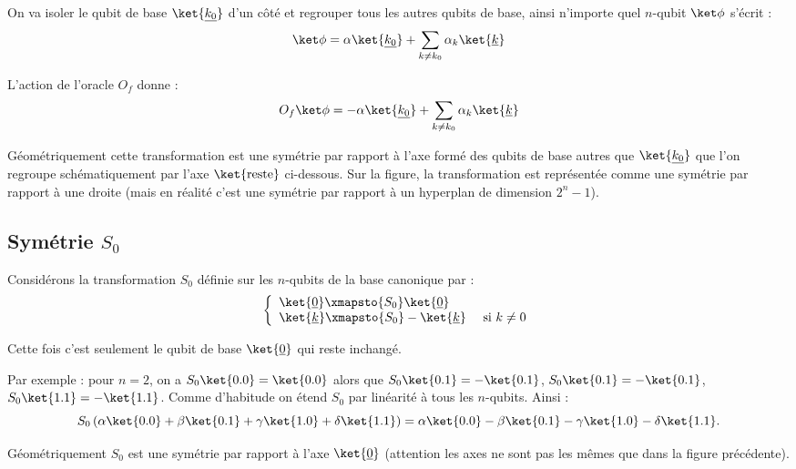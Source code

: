 \documentclass[11pt,class=report,crop=false]{standalone}
\begin{document}
On va isoler le qubit de base $\ket{\underline{k_0}}$ d'un côté et regrouper tous les autres qubits de base, ainsi n'importe quel $n$-qubit $\ket\phi$ s'écrit :
$$\ket\phi = \alpha \ket{\underline{k_0}} + \sum_{k\neq k_0} \alpha_k \ket{\underline{k}}$$

L'action de l'oracle $O_f$ donne :
$$O_f \ket\phi = -\alpha \ket{\underline{k_0}} + \sum_{k\neq k_0} \alpha_k \ket{\underline{k}}$$

Géométriquement cette transformation est une symétrie par rapport à l'axe formé des qubits de base autres que $\ket{\underline{k_0}}$ que l'on regroupe schématiquement par l'axe $\ket{\text{reste}}$ ci-dessous. Sur la figure, la transformation est représentée comme une symétrie par rapport à une droite (mais en réalité c'est une symétrie par rapport à un hyperplan de dimension $2^n-1$).



\subsection{Symétrie $S_0$}

Considérons la transformation $S_0$ définie sur les $n$-qubits de la base canonique par :
$$\left\{
\begin{array}{l}
\ket{\underline{0}} \xmapsto{S_0} \ket{\underline{0}} \\
\ket{\underline{k}} \xmapsto{S_0} -\ket{\underline{k}} \quad \text{ si } k\neq 0 \\
\end{array}
\right.$$

Cette fois c'est seulement le qubit de base $\ket{\underline{0}}$ qui reste inchangé.


Par exemple : pour $n=2$, on a $S_0 \ket{0.0} = \ket{0.0}$ alors que $S_0 \ket{0.1} = -\ket{0.1}$, $S_0 \ket{0.1} = -\ket{0.1}$, $S_0 \ket{1.1} = -\ket{1.1}$. Comme d'habitude on étend $S_0$ par linéarité à tous les $n$-qubits.
Ainsi :
$$S_0 \left( \alpha\ket{0.0} + \beta\ket{0.1} + \gamma\ket{1.0} + \delta\ket{1.1} \right) =	
\alpha\ket{0.0} - \beta\ket{0.1} - \gamma\ket{1.0} - \delta\ket{1.1}.$$

Géométriquement $S_0$ est une symétrie par rapport à l'axe $\ket{\underline0}$ (attention les axes ne sont pas les mêmes que dans la figure précédente).

\end{document}
